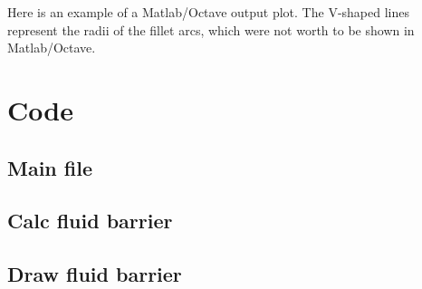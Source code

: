 \documentclass[b5paper,11pt,oneside,fleqn]{article}
\begin{document}
Here is an example of a Matlab/Octave output plot.
The V-shaped lines represent the radii of the fillet arcs, which were not worth 
to be shown in Matlab/Octave.




\clearpage
\section{Code}

\subsection{Main file}

\clearpage

\subsection{Calc fluid barrier}

\clearpage

\subsection{Draw fluid barrier}

\end{document}
